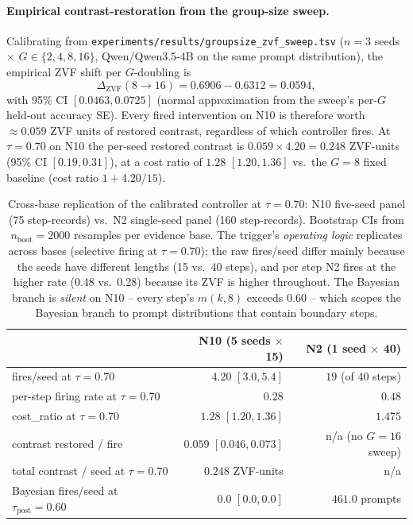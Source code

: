 \documentclass{article}
\begin{document}
\paragraph{Empirical contrast-restoration from the group-size sweep.}
Calibrating from
\texttt{experiments/results/groupsize\_zvf\_sweep.tsv}
($n{=}3$ seeds $\times$ $G \in \{2, 4, 8, 16\}$, Qwen/Qwen3.5-4B
on the same prompt distribution), the empirical ZVF shift per
$G$-doubling is
\[
\Delta_{\mathrm{ZVF}}(8 \to 16) = 0.6906 - 0.6312 = 0.0594,
\]
with 95\% CI $[0.0463, 0.0725]$ (normal approximation from the
sweep's per-$G$ held-out accuracy SE). Every fired intervention
on N10 is therefore worth $\approx 0.059$ ZVF units of restored
contrast, regardless of which controller fires. At $\tau{=}0.70$
on N10 the per-seed restored contrast is
$0.059 \times 4.20 = 0.248$ ZVF-units (95\% CI $[0.19, 0.31]$),
at a cost ratio of $1.28$ $[1.20, 1.36]$ vs.\ the $G{=}8$
fixed baseline (cost ratio $1 + 4.20/15$).

\begin{table}[t]
\centering
\caption{Cross-base replication of the calibrated controller at
$\tau{=}0.70$: N10 five-seed panel (75 step-records) vs.\ N2
single-seed panel (160 step-records). Bootstrap CIs from $n_{\text{boot}}{=}2000$
resamples per evidence base. The trigger's \emph{operating logic}
replicates across bases (selective firing at $\tau{=}0.70$); the
raw fires/seed differ mainly because the seeds have different
lengths (15 vs.\ 40 steps), and per step N2 fires at the higher
rate (0.48 vs.\ 0.28) because its ZVF is higher throughout. The
Bayesian branch is \emph{silent} on N10 -- every step's $m(k, 8)$
exceeds $0.60$ -- which scopes the Bayesian branch to prompt
distributions that contain boundary steps.}
\label{tab:p7-cross-base}
\begin{tabular}{lrr}
\toprule
 & \textbf{N10 (5 seeds $\times$ 15)} & \textbf{N2 (1 seed $\times$ 40)} \\
\midrule
fires/seed at $\tau{=}0.70$         & $4.20$ $[3.0, 5.4]$    & $19$ (of 40 steps)   \\
per-step firing rate at $\tau{=}0.70$ & $0.28$               & $0.48$               \\
cost\_ratio at $\tau{=}0.70$        & $1.28$ $[1.20, 1.36]$  & $1.475$               \\
contrast restored / fire            & $0.059$ $[0.046, 0.073]$ & n/a (no $G{=}16$ sweep) \\
total contrast / seed at $\tau{=}0.70$ & $0.248$ ZVF-units     & n/a                   \\
Bayesian fires/seed at $\tau_{\text{post}}{=}0.60$ & $0.0$ $[0.0, 0.0]$ & $461.0$ prompts \\
\bottomrule
\end{tabular}
\end{table}
\end{document}
